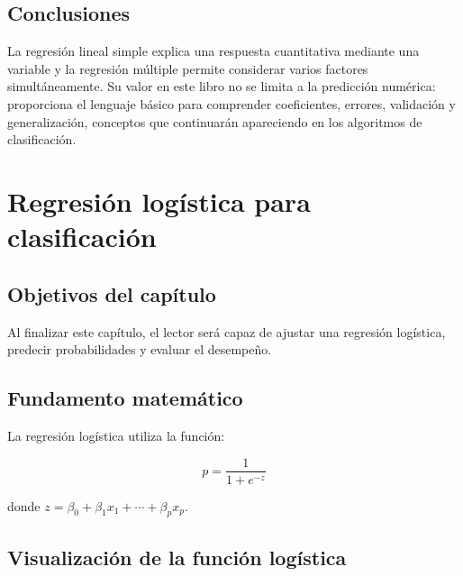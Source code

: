 \documentclass[
  spanish,
  10.5pt,
  letterpaper,
  openany,
  headings=big]{scrbook}
\begin{document}
\section{Conclusiones}\label{conclusiones}

La regresión lineal simple explica una respuesta cuantitativa mediante
una variable y la regresión múltiple permite considerar varios factores
simultáneamente. Su valor en este libro no se limita a la predicción
numérica: proporciona el lenguaje básico para comprender coeficientes,
errores, validación y generalización, conceptos que continuarán
apareciendo en los algoritmos de clasificación.


\chapter{Regresión logística para
clasificación}\label{regresiuxf3n-loguxedstica-para-clasificaciuxf3n}

\section{Objetivos del capítulo}\label{objetivos-del-capuxedtulo-4}

Al finalizar este capítulo, el lector será capaz de ajustar una
regresión logística, predecir probabilidades y evaluar el desempeño.

\section{Fundamento matemático}\label{fundamento-matemuxe1tico}

La regresión logística utiliza la función:

\[
p = \frac{1}{1 + e^{-z}}
\]

donde \(z = \beta_0 + \beta_1x_1 + \cdots + \beta_px_p\).

\section{Visualización de la función
logística}\label{visualizaciuxf3n-de-la-funciuxf3n-loguxedstica}
\end{document}
